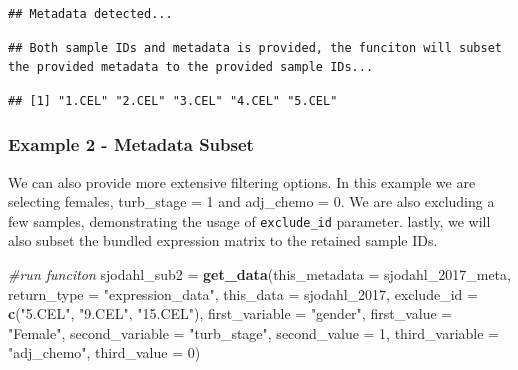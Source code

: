 \documentclass[
]{article}
\newenvironment{Shaded}{\begin{snugshade}}{\end{snugshade}}
\newcommand{\AttributeTok}[1]{\textcolor[rgb]{0.13,0.29,0.53}{#1}}
\newcommand{\CommentTok}[1]{\textcolor[rgb]{0.56,0.35,0.01}{\textit{#1}}}
\newcommand{\DecValTok}[1]{\textcolor[rgb]{0.00,0.00,0.81}{#1}}
\newcommand{\FunctionTok}[1]{\textcolor[rgb]{0.13,0.29,0.53}{\textbf{#1}}}
\newcommand{\NormalTok}[1]{#1}
\newcommand{\OtherTok}[1]{\textcolor[rgb]{0.56,0.35,0.01}{#1}}
\newcommand{\SpecialCharTok}[1]{\textcolor[rgb]{0.81,0.36,0.00}{\textbf{#1}}}
\newcommand{\StringTok}[1]{\textcolor[rgb]{0.31,0.60,0.02}{#1}}
\begin{document}
\begin{verbatim}
## Metadata detected...
\end{verbatim}

\begin{verbatim}
## Both sample IDs and metadata is provided, the funciton will subset the provided metadata to the provided sample IDs...
\end{verbatim}

\begin{Shaded}
\end{Shaded}

\begin{verbatim}
## [1] "1.CEL" "2.CEL" "3.CEL" "4.CEL" "5.CEL"
\end{verbatim}

\subsubsection{Example 2 - Metadata
Subset}\label{example-2---metadata-subset}

We can also provide more extensive filtering options. In this example we
are selecting females, turb\_stage = 1 and adj\_chemo = 0. We are also
excluding a few samples, demonstrating the usage of \texttt{exclude\_id}
parameter. lastly, we will also subset the bundled expression matrix to
the retained sample IDs.

\begin{Shaded}
\begin{Highlighting}[]
\CommentTok{\#run funciton}
\NormalTok{sjodahl\_sub2 }\OtherTok{=} \FunctionTok{get\_data}\NormalTok{(}\AttributeTok{this\_metadata =}\NormalTok{ sjodahl\_2017\_meta,}
                        \AttributeTok{return\_type =} \StringTok{"expression\_data"}\NormalTok{, }
                        \AttributeTok{this\_data =}\NormalTok{ sjodahl\_2017,}
                        \AttributeTok{exclude\_id =} \FunctionTok{c}\NormalTok{(}\StringTok{"5.CEL"}\NormalTok{, }\StringTok{"9.CEL"}\NormalTok{, }\StringTok{"15.CEL"}\NormalTok{),}
                        \AttributeTok{first\_variable =} \StringTok{"gender"}\NormalTok{, }
                        \AttributeTok{first\_value =} \StringTok{"Female"}\NormalTok{, }
                        \AttributeTok{second\_variable =} \StringTok{"turb\_stage"}\NormalTok{, }
                        \AttributeTok{second\_value =} \DecValTok{1}\NormalTok{, }
                        \AttributeTok{third\_variable =} \StringTok{"adj\_chemo"}\NormalTok{, }
                        \AttributeTok{third\_value =} \DecValTok{0}\NormalTok{)}
\end{Highlighting}
\end{Shaded}
\end{document}

